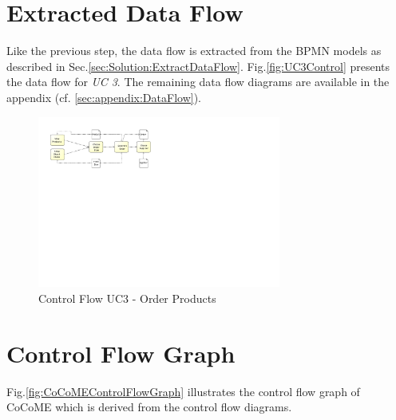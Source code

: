 \section{Extracted Data Flow}

Like the previous step, the data flow is extracted from the BPMN models as described in Sec.\ref{sec:Solution:ExtractDataFlow}. Fig.\ref{fig:UC3Control} presents the data flow for \textit{UC 3}. The remaining data flow diagrams are available in the appendix (cf. \ref{sec:appendix:DataFlow}).

\begin{figure}[h!]
	\centering
	\includegraphics[width=8cm, trim={5cm 14cm 17cm 0cm}]{img/UC3DFD.pdf}
	\caption{Control Flow UC3 - Order Products}
	\label{fig:UC3DFD}
\end{figure}

\section{Control Flow Graph}
Fig.\ref{fig:CoCoMEControlFlowGraph} illustrates the control flow graph of CoCoME which is derived from the control flow diagrams. 

